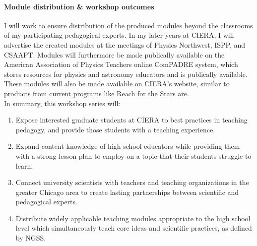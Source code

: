 \documentclass[11pt, preprint]{aastex}
\begin{document}
\vspace{-0.5cm}
\paragraph{Module distribution \& workshop outcomes} 
I will work to ensure distribution of the produced modules beyond the classrooms of my participating pedagogical experts.
In my later years at CIERA, I will advertise the created modules at the meetings of Physics Northwest, ISPP, and CSAAPT.
Modules will furthermore be made publically available on the American Association of Physics Teachers online ComPADRE system, which stores resources for physics and astronomy educators and is publically available.
These modules will also be made available on CIERA's website, similar to products from current programs like Reach for the Stars are.
 \vspace{2pt}\\
In summary, this workshop series will: 
\vspace{-14pt}
\begin{enumerate}
\item Expose interested graduate students at CIERA to best practices in teaching pedagogy, and provide those students with a teaching experience.
\vspace{-9pt}
\item Expand content knowledge of high school educators while providing them with a strong lesson plan to employ on a topic that their students struggle to learn.
\item Connect university scientists with teachers and teaching organizations in the greater Chicago area to create lasting partnerships between scientific and pedagogical experts.
\vspace{-9pt}
\item Distribute widely applicable teaching modules appropriate to the high school level which simultaneously teach core ideas and scientific practices, as defined by NGSS.
\vspace{-9pt}
\end{enumerate}



\vspace{-22pt}
\end{document}
